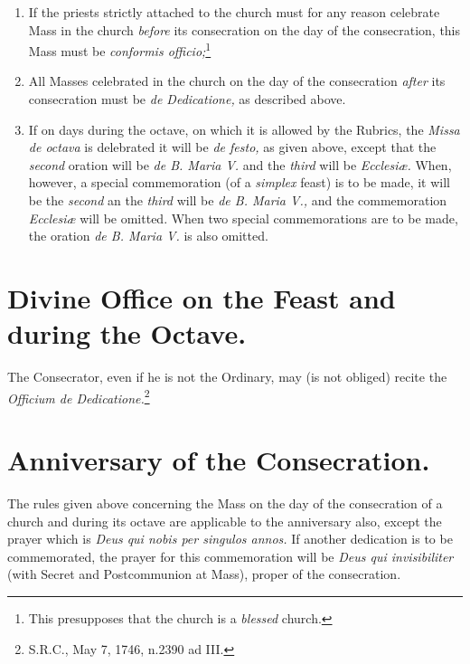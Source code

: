 \documentclass[letterpaper]{report}
\newcommand\src{\textsc{S.R.C.}}
\begin{document}
{\begin{enumerate}
        \item If the priests strictly attached to the church must for any reason
            celebrate Mass in the church \textit{before} its consecration on the
            day of the consecration, this Mass must be \textit{conformis
            officio;}\footnote{This presupposes that the church is a
            \textit{blessed} church.}

        \item All Masses celebrated in the church on the day of the consecration
            \textit{after} its consecration must be \textit{de Dedicatione,} as
            described above.

        \item If on days during the octave, on which it is allowed by the Rubrics,
            the \textit{Missa de octava} is delebrated it will be \textit{de
            festo,} as given above, except that the \textit{second} oration will be
            \textit{de B. Maria V.} and the \textit{third} will be
            \textit{Ecclesi\ae.} When, however, a special commemoration (of a
            \textit{simplex} feast) is to be made, it will be the \textit{second}
            an the \textit{third} will be \textit{de B. Maria V.,} and the
            commemoration \textit{Ecclesi\ae} will be omitted. When two special
            commemorations are to be made, the oration \textit{de B. Maria V.} is
            also omitted.

    \end{enumerate}

    \section{Divine Office on the Feast and during the Octave.}

    \rubric The Consecrator, even if he is not the Ordinary, may (is not obliged)
    recite the \textit{Officium de Dedicatione.}\footnote{\src, May 7, 1746,
    n.2390 ad III.}

    \section{Anniversary of the Consecration.}

    \rubric The rules given above concerning the Mass on the day of the
    consecration of a church and during its octave are applicable to the
    anniversary also, except the prayer which is \textit{Deus qui nobis per
    singulos annos.} If another dedication is to be commemorated, the prayer for
    this commemoration will be \textit{Deus qui invisibiliter} (with Secret and
    Postcommunion at Mass), proper of the consecration.

}

\nocite{levav:churchconsecration}
\nocite{ml:1947}
\nocite{ml:1959}
\nocite{rc:ecclesiae}
\nocite{martinucci:3}
\printbibliography
    
\end{document}
